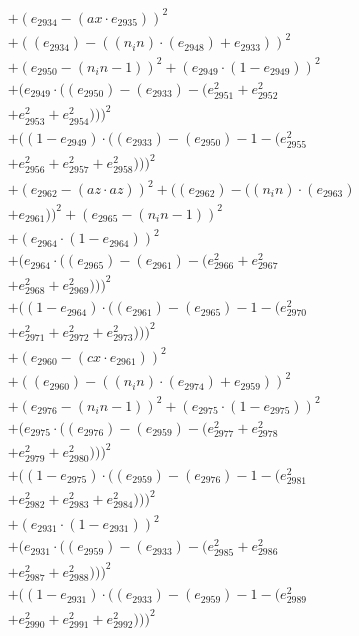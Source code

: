 \documentclass[10pt, a4paper]{article}
\begin{document}
\begin{align*}
& + (e_{2934} - (ax  \cdot  e_{2935}))^{2} \\
& + ((e_{2934}) - ((n_in)  \cdot  (e_{2948}) + e_{2933}))^{2} \\
& + (e_{2950} - (n_in - 1))^{2} + (e_{2949}  \cdot  (1 - e_{2949}))^{2} \\
& + (e_{2949}  \cdot  ((e_{2950}) - (e_{2933}) - (e_{2951}^{2} + e_{2952}^{2} \\
& + e_{2953}^{2} + e_{2954}^{2})))^{2} \\
& + ((1 - e_{2949})  \cdot  ((e_{2933}) - (e_{2950}) - 1 - (e_{2955}^{2} \\
& + e_{2956}^{2} + e_{2957}^{2} + e_{2958}^{2})))^{2} \\
& + (e_{2962} - (az  \cdot  az))^{2} + ((e_{2962}) - ((n_in)  \cdot  (e_{2963}) \\
& + e_{2961}))^{2} + (e_{2965} - (n_in - 1))^{2} \\
& + (e_{2964}  \cdot  (1 - e_{2964}))^{2} \\
& + (e_{2964}  \cdot  ((e_{2965}) - (e_{2961}) - (e_{2966}^{2} + e_{2967}^{2} \\
& + e_{2968}^{2} + e_{2969}^{2})))^{2} \\
& + ((1 - e_{2964})  \cdot  ((e_{2961}) - (e_{2965}) - 1 - (e_{2970}^{2} \\
& + e_{2971}^{2} + e_{2972}^{2} + e_{2973}^{2})))^{2} \\
& + (e_{2960} - (cx  \cdot  e_{2961}))^{2} \\
& + ((e_{2960}) - ((n_in)  \cdot  (e_{2974}) + e_{2959}))^{2} \\
& + (e_{2976} - (n_in - 1))^{2} + (e_{2975}  \cdot  (1 - e_{2975}))^{2} \\
& + (e_{2975}  \cdot  ((e_{2976}) - (e_{2959}) - (e_{2977}^{2} + e_{2978}^{2} \\
& + e_{2979}^{2} + e_{2980}^{2})))^{2} \\
& + ((1 - e_{2975})  \cdot  ((e_{2959}) - (e_{2976}) - 1 - (e_{2981}^{2} \\
& + e_{2982}^{2} + e_{2983}^{2} + e_{2984}^{2})))^{2} \\
& + (e_{2931}  \cdot  (1 - e_{2931}))^{2} \\
& + (e_{2931}  \cdot  ((e_{2959}) - (e_{2933}) - (e_{2985}^{2} + e_{2986}^{2} \\
& + e_{2987}^{2} + e_{2988}^{2})))^{2} \\
& + ((1 - e_{2931})  \cdot  ((e_{2933}) - (e_{2959}) - 1 - (e_{2989}^{2} \\
& + e_{2990}^{2} + e_{2991}^{2} + e_{2992}^{2})))^{2} \\

\end{align*}
\end{document}
